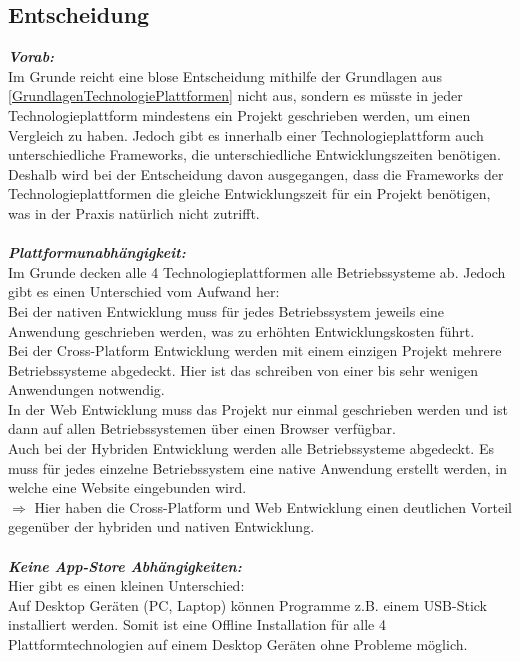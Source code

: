 \documentclass[ngerman]{article}
\begin{document}
    \subsection{Entscheidung}
    \label{TechnologieplattformEntscheidung}
    \textbf{\textit{Vorab:}}\\
    Im Grunde reicht eine blose Entscheidung mithilfe der Grundlagen aus \ref{GrundlagenTechnologiePlattformen} nicht aus, sondern es müsste in jeder Technologieplattform mindestens ein Projekt geschrieben werden, um einen Vergleich zu haben. Jedoch gibt es innerhalb einer Technologieplattform auch unterschiedliche Frameworks, die unterschiedliche Entwicklungszeiten benötigen. Deshalb wird bei der Entscheidung davon ausgegangen, dass die Frameworks der Technologieplattformen die gleiche Entwicklungszeit für ein Projekt benötigen, was in der Praxis natürlich nicht zutrifft.\\\\
    \textbf{\textit{Plattformunabhängigkeit:}}\\
    Im Grunde decken alle 4 Technologieplattformen alle Betriebssysteme ab. Jedoch gibt es einen Unterschied vom Aufwand her:\\
    \indent Bei der nativen Entwicklung muss für jedes Betriebssystem jeweils eine Anwendung geschrieben werden, was zu erhöhten Entwicklungskosten führt.\\
    \indent Bei der Cross-Platform Entwicklung werden mit einem einzigen Projekt mehrere Betriebssysteme abgedeckt. Hier ist das schreiben von einer bis sehr wenigen Anwendungen notwendig.\\
    \indent In der Web Entwicklung muss das Projekt nur einmal geschrieben werden und ist dann auf allen Betriebssystemen über einen Browser verfügbar.\\
    \indent Auch bei der Hybriden Entwicklung werden alle Betriebssysteme abgedeckt. Es muss für jedes einzelne Betriebssystem eine native Anwendung erstellt werden, in welche eine Website eingebunden wird.\\
    \indent $\Rightarrow$ Hier haben die Cross-Platform und Web Entwicklung einen deutlichen Vorteil gegenüber der hybriden und nativen Entwicklung.\\\\
    \textbf{\textit{Keine App-Store Abhängigkeiten:}}\\
    Hier gibt es einen kleinen Unterschied:\\
    \indent Auf Desktop Geräten (PC, Laptop) können Programme z.B. einem USB-Stick installiert werden. Somit ist eine Offline Installation für alle 4 Plattformtechnologien auf einem Desktop Geräten ohne Probleme möglich.\\
\end{document}

